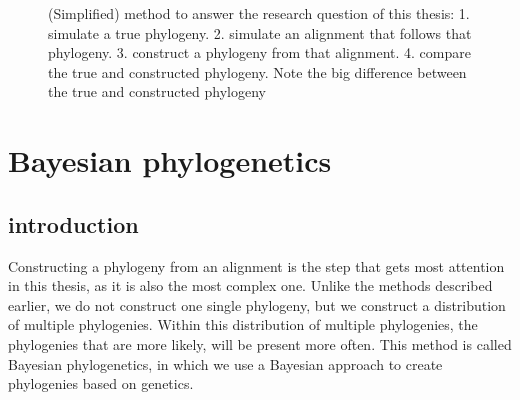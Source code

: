 \begin{figure}[H]
{
  }
  \caption{
    (Simplified) method to answer the research question of this thesis:
    1. simulate a true phylogeny. 
    2. simulate an alignment that follows that phylogeny. 
    3. construct a phylogeny from that alignment.
    4. compare the true and constructed phylogeny.
    Note the big difference between the true and constructed phylogeny
  }
  \label{fig:research_workflow_single}
\end{figure}


\section{Bayesian phylogenetics}



\subsection{introduction}

Constructing a phylogeny from an alignment is the step that
gets most attention in this thesis, as it is also the most complex
one. Unlike the methods described earlier, 
we do not construct one single phylogeny, 
but we construct a distribution of multiple phylogenies.
Within this distribution of multiple phylogenies, the phylogenies
that are more likely, will be present more often.
This method is called Bayesian phylogenetics, in which we use
a Bayesian approach to create phylogenies based on genetics.

